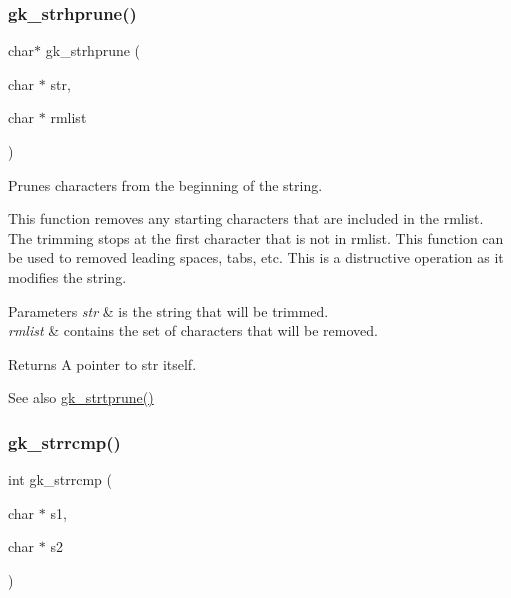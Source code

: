 \subsubsection{\texorpdfstring{gk\+\_\+strhprune()}{gk\_strhprune()}}
{\footnotesize\ttfamily char$\ast$ gk\+\_\+strhprune (\begin{DoxyParamCaption}\item[{char $\ast$}]{str,  }\item[{char $\ast$}]{rmlist }\end{DoxyParamCaption})}



Prunes characters from the beginning of the string. 

This function removes any starting characters that are included in the {\ttfamily rmlist}. The trimming stops at the first character that is not in {\ttfamily rmlist}. This function can be used to removed leading spaces, tabs, etc. This is a distructive operation as it modifies the string.


\begin{DoxyParams}{Parameters}
{\em str} & is the string that will be trimmed. \\
\hline
{\em rmlist} & contains the set of characters that will be removed. \\
\hline
\end{DoxyParams}
\begin{DoxyReturn}{Returns}
A pointer to {\ttfamily str} itself. 
\end{DoxyReturn}
\begin{DoxySeeAlso}{See also}
\hyperlink{a00143_a05261ee12d082a78cabc018d2f5e2266}{gk\+\_\+strtprune()} 
\end{DoxySeeAlso}
\mbox{\label{a00143_a50149c8c9f8dd36fcad46773f35eedc4}} 
\subsubsection{\texorpdfstring{gk\+\_\+strrcmp()}{gk\_strrcmp()}}
{\footnotesize\ttfamily int gk\+\_\+strrcmp (\begin{DoxyParamCaption}\item[{char $\ast$}]{s1,  }\item[{char $\ast$}]{s2 }\end{DoxyParamCaption})}



